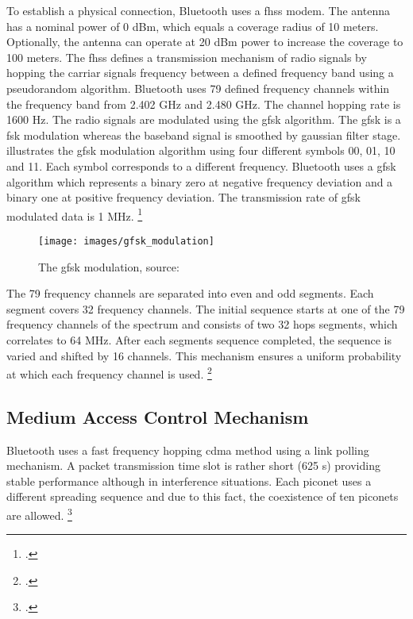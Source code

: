 To establish a physical connection, Bluetooth uses a \gls{fhss} modem. The antenna has a nominal power of 0 dBm, which equals a coverage radius of 10 meters. Optionally, the antenna can operate at 20 dBm power to increase the coverage to 100 meters. The \gls{fhss} defines a transmission mechanism of radio signals by hopping the carriar signals frequency between a defined frequency band using a pseudorandom algorithm. Bluetooth uses 79 defined frequency channels within the frequency band from 2.402 GHz and 2.480 GHz. The channel hopping rate is 1600 Hz. The radio signals are modulated using the \gls{gfsk} algorithm. The \gls{gfsk} is a \gls{fsk} modulation whereas the baseband signal is smoothed by gaussian filter stage.  illustrates the \gls{gfsk} modulation algorithm using four different symbols 00, 01, 10 and 11. Each symbol corresponds to a different frequency. Bluetooth uses a \gls{gfsk} algorithm which represents a binary zero at negative frequency deviation and a binary one at positive frequency deviation. The transmission rate of \gls{gfsk} modulated data is 1 MHz. \footcite[Cf.][450-451]{Pahlavan2009}

\begin{figure}[ht]
  \centering
  \texttt{[image: images/gfsk\_modulation]}
  \caption{The \gls{gfsk} modulation, source: \cite{Gast2005}}
  \label{fig:gfsk_modulation}
\end{figure}

The 79 frequency channels are separated into even and odd segments. Each segment covers 32 frequency channels. The initial sequence starts at one of the 79 frequency channels of the spectrum and consists of two 32 hops segments, which correlates to 64 MHz. After each segments sequence completed, the sequence is varied and shifted by 16 channels. This mechanism ensures a uniform probability at which each frequency channel is used. \footcite[Cf.][451]{Pahlavan2009}

\subsection{Medium Access Control Mechanism}

Bluetooth uses a fast frequency hopping \gls{cdma} method using a link polling mechanism. A packet transmission time slot is rather short (625 \textmu s) providing stable performance although in interference situations. Each piconet uses a different spreading sequence and due to this fact, the coexistence of ten piconets are allowed. \footcite[Cf.][452]{Pahlavan2009}

